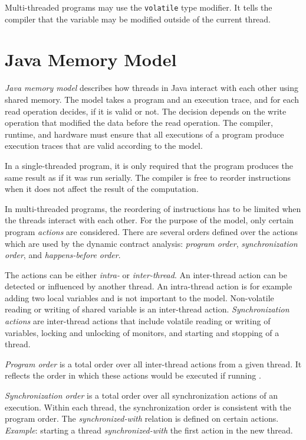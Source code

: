 Multi-threaded programs may use the \texttt{volatile} type modifier. It tells
the compiler that the variable may be modified outside of the current thread.

\section{Java Memory Model}


\emph{Java memory model} describes how threads in Java interact with each other
using shared memory. The model takes a program and an execution trace, and for
each read operation decides, if it is valid or not. The decision depends on the
write operation that modified the data before the read operation. The compiler,
runtime, and hardware must ensure that all executions of a program produce
execution traces that are valid according to the model.

In a single-threaded program, it is only required that the program produces the
same result as if it was run serially. The compiler is free to reorder
instructions when it does not affect the result of the computation.

In multi-threaded programs, the reordering of instructions has to be limited
when the threads interact with each other. For the purpose of the model, only
certain program \emph{actions} are considered. There are several orders defined
over the actions which are used by the dynamic contract analysis: \emph{program
order}, \emph{synchronization order}, and \emph{happens-before order}.

The actions can be either \emph{intra-} or \emph{inter-thread}. An inter-thread
action can be detected or influenced by another thread. An intra-thread action
is for example adding two local variables and is not important to the model.
Non-volatile reading or writing of shared variable is an inter-thread action.
\emph{Synchronization actions} are inter-thread actions that include volatile
reading or writing of variables, locking and unlocking of monitors, and starting
and stopping of a thread.

\emph{Program order} is a total order over all inter-thread actions from a given
thread. It reflects the order in which these actions would be executed if
running \todo{} .

\emph{Synchronization order} is a total order over all synchronization actions
of an execution. Within each thread, the synchronization order is consistent
with the program order. The \emph{synchronized-with} relation is defined on
certain actions. \emph{Example}: starting a thread \emph{synchronized-with} the
first action in the new thread.

